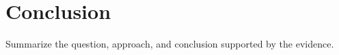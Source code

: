 \section{Conclusion}
\label{sec:conclusion}
Summarize the question, approach, and conclusion supported by the evidence.
